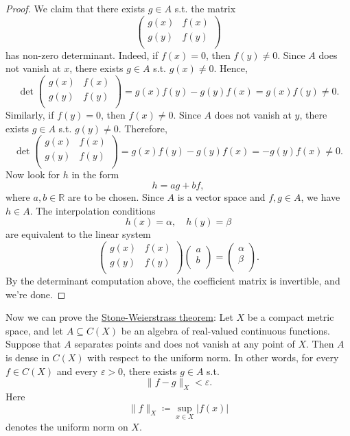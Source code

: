 \begin{proof}
    We claim that there exists \(g \in A\) s.t. the matrix 
    \[
        \begin{pmatrix}
            g(x) & f(x)  \\
            g(y) & f(y)  \\
        \end{pmatrix}
    \]        
    has non-zero determinant. Indeed, if \(f(x) = 0\), then \(f(y) \neq 0\). Since \(A\) does not vanish at \(x\), there exists \(g \in A\) s.t. \(g(x) \neq 0\). Hence,
    \[
        \det \begin{pmatrix}
            g(x) & f(x)  \\
            g(y) & f(y)  \\
        \end{pmatrix} = g(x) f(y) - g(y) f(x) = g(x) f(y) \neq 0.
    \]      
    Similarly, if \(f(y) = 0\), then \(f(x) \neq 0\). Since \(A\) does not vanish at \(y\), there exists \(g \in A\) s.t. \(g(y) \neq 0\). Therefore,
    \[
        \det \begin{pmatrix}
            g(x) & f(x)  \\
            g(y) & f(y)  \\
        \end{pmatrix} = g(x) f(y) - g(y) f(x) = - g(y) f(x) \neq 0.
    \]      
    Now look for \(h\) in the form 
    \[
        h = ag + bf,
    \] 
    where \(a, b \in \mathbb{R}\) are to be chosen. Since \(A\) is a vector space and \(f, g \in A\), we have \(h \in A\). The interpolation conditions 
    \[
        h(x) = \alpha, \quad h(y) = \beta
    \]    
    are equivalent to the linear system 
    \[
        \begin{pmatrix}
            g(x) & f(x)  \\
            g(y) & f(y)  \\
        \end{pmatrix} \begin{pmatrix}
             a \\
             b \\
        \end{pmatrix} = \begin{pmatrix}
             \alpha \\
             \beta \\
        \end{pmatrix}.
    \]
    By the determinant computation above, the coefficient matrix is invertible, and we're done.
\end{proof}

Now we can prove the \hyperref[thm: Stone-Weierstrass]{Stone-Weierstrass theorem}:
Let \(X\) be a compact metric space, and let \(A \subseteq C(X)\) be an algebra of real-valued continuous functions. Suppose that \(A\) separates points and does not vanish at any point of \(X\). Then \(A\) is dense in \(C(X)\) with respect to the uniform norm. In other words, for every \(f \in C(X)\) and every \(\varepsilon > 0\), there exists \(g \in A\) s.t. 
\[
    \lVert f - g \rVert_X < \varepsilon. 
\]         
Here 
\[
    \lVert f \rVert_X \coloneqq \sup _{x \in X} \vert f(x) \vert  
\]
denotes the uniform norm on \(X\). 

